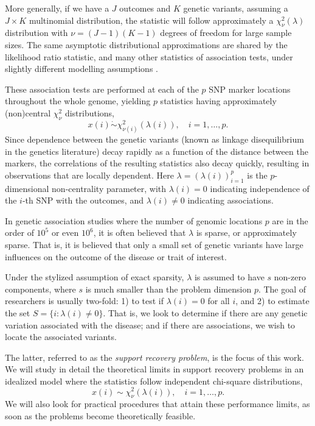 More generally, if we have a $J$ outcomes and $K$ genetic variants, assuming a $J\times K$ multinomial distribution, the statistic will follow approximately a $\chi^2_{\nu}(\lambda)$ distribution with $\nu = (J-1)(K-1)$ degrees of freedom for large sample sizes.
The same asymptotic distributional approximations are shared by the likelihood ratio statistic, and many other statistics of association tests, under slightly different modelling assumptions \cite{gao2019upass}.

These association tests are performed at each of the $p$ SNP marker locations throughout the whole genome, yielding $p$ statistics having approximately (non)central $\chi^2_{\nu}$ distributions,
\begin{equation} \label{eq:model-chisquare-approx}
    x(i) \mathrel{\dot\sim} \chi_{\nu(i)}^2\left(\lambda(i)\right), \quad i=1,\ldots,p.
\end{equation}
Since dependence between the genetic variants (known as linkage disequilibrium in the genetics literature) decay rapidly as a function of the distance between the markers, the correlations of the resulting statistics also decay quickly, resulting in observations that are locally dependent.
Here $\lambda = (\lambda(i))_{i=1}^p$ is the $p$-dimensional non-centrality parameter, with $\lambda(i)=0$ indicating independence of the $i$-th SNP with the outcomes, and $\lambda(i)\neq0$ indicating associations.

In genetic association studies where the number of genomic locations $p$ are in the order of $10^5$ or even $10^6$, it is often believed that $\lambda$ is sparse, or approximately sparse.
That is, it is believed that only a small set of genetic variants have large influences on the outcome of the disease or trait of interest.

Under the stylized assumption of exact sparsity, $\lambda$ is assumed to have $s$ non-zero components, where $s$ is much smaller than the problem dimension $p$. 
The goal of researchers is usually two-fold: 1) to test if $\lambda(i)=0$ for all $i$, and 2) to estimate the set $S=\{i:\lambda(i)\neq 0\}$.
That is, we look to determine if there are any genetic variation associated with the disease; and if there are associations, we wish to locate the associated variants.

The latter, referred to as the \emph{support recovery problem}, is the focus of this work.
We will study in detail the theoretical limits in support recovery problems in an idealized model where the statistics follow independent chi-square distributions,
\begin{equation} \label{eq:model-chisq}
    x(i) \sim \chi_\nu^2\left(\lambda(i)\right), \quad i=1,\ldots,p.
\end{equation}
We will also look for practical procedures that attain these performance limits, as soon as the problems become theoretically feasible.

